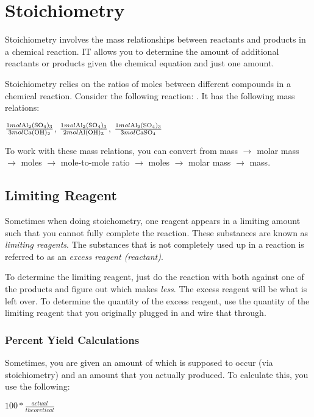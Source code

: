 \section{Stoichiometry}
Stoichiometry involves the mass relationships between reactants and products in
a chemical reaction.  IT allows you to determine the amount of additional
reactants or products given the chemical equation and just one amount.

Stoichiometry relies on the ratios of moles between different compounds in a
chemical reaction.  Consider the following reaction: .  It has the following mass relations:

\begin{frame}
  \centering
  {\huge $\frac{1mol \ce{Al2(SO4)3}}{3mol \ce{Ca(OH)2}}$, $\frac{1mol
  \ce{Al2(SO4)3}}{2mol \ce{Al(OH)3}}$, $\frac{1mol \ce{Al2(SO4)3}}{3mol
  \ce{CaSO4}}$}
\end{frame}

To work with these mass relations, you can convert from mass $\rightarrow$ molar
mass $\rightarrow$ moles $\rightarrow$ mole-to-mole ratio $\rightarrow$ moles
$\rightarrow$ molar mass $\rightarrow$ mass.

\subsection{Limiting Reagent}
Sometimes when doing stoichometry, one reagent appears in a limiting amount such
that you cannot fully complete the reaction.  These substances are known as
\textit{limiting reagents}.  The substances that is not completely used up in a
reaction is referred to as an \textit{excess reagent (reactant)}.

To determine the limiting reagent, just do the reaction with both against one of
the products and figure out which makes \textit{less}.  The excess reagent will
be what is left over.  To determine the quantity of the excess reagent, use the
quantity of the limiting reagent that you originally plugged in and wire that
through.

\subsubsection{Percent Yield Calculations}
Sometimes, you are given an amount of which is supposed to occur (via
stoichiometry) and an amount that you actually produced.  To calculate this, you
use the following:

{\huge $100 * \frac{actual}{theoretical}$}
